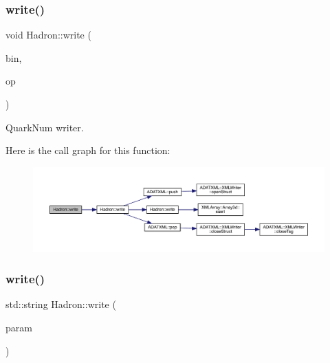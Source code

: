 \subsubsection{\texorpdfstring{write()}{write()}\hspace{0.1cm}{\footnotesize\ttfamily [13/95]}}
{\footnotesize\ttfamily void Hadron\+::write (\begin{DoxyParamCaption}\item[{\mbox{\hyperlink{classADATIO_1_1BinaryWriter}{Binary\+Writer}} \&}]{bin,  }\item[{const \mbox{\hyperlink{structHadron_1_1QuarkNum__t}{Quark\+Num\+\_\+t}} \&}]{op }\end{DoxyParamCaption})}



Quark\+Num writer. 

Here is the call graph for this function\+:
\nopagebreak
\begin{figure}[H]
\begin{center}
\leavevmode
\includegraphics[width=350pt]{d1/daf/namespaceHadron_a44eb64f50cbbc947364a538026c97ee6_cgraph}
\end{center}
\end{figure}
\mbox{\label{namespaceHadron_a4af69bc389ee44d25d1f3efa30042e4c}} 
\subsubsection{\texorpdfstring{write()}{write()}\hspace{0.1cm}{\footnotesize\ttfamily [14/95]}}
{\footnotesize\ttfamily std\+::string Hadron\+::write (\begin{DoxyParamCaption}\item[{const \mbox{\hyperlink{structHadron_1_1KeyCGCSU3__t}{Key\+C\+G\+C\+S\+U3\+\_\+t}} \&}]{param }\end{DoxyParamCaption})}

\mbox{\label{namespaceHadron_a5dd8ceac99cd9e526324bf30fca8e225}} 

